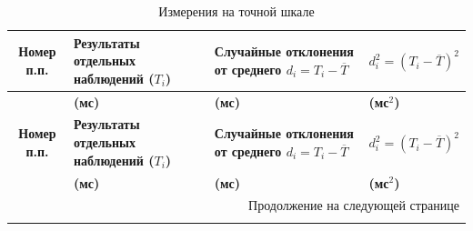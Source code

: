 \vspace{0.5cm}
\begin{longtable}{|c|p{3.2cm}|p{3.5cm}|p{3.5cm}|}
\caption{Измерения на точной шкале}
\label{tabl:2}\\
\hline
\textbf{Номер п.п.} & \textbf{Результаты отдельных наблюдений ($T_i$)} & \textbf{Случайные отклонения от среднего $d_i = T_i - \overline{T}$} & \textbf{$d_i^2 = (T_i - \overline{T})^2$} \\
\hline
 & \textbf{(мс)} & \textbf{(мс)} & \textbf{(мс\(^2\))} \\
\hline
\endfirsthead

\hline
\textbf{Номер п.п.} & \textbf{Результаты отдельных наблюдений ($T_i$)} & \textbf{Случайные отклонения от среднего $d_i = T_i - \overline{T}$} & \textbf{$d_i^2 = (T_i - \overline{T})^2$} \\
\hline
 & \textbf{(мс)} & \textbf{(мс)} & \textbf{(мс\(^2\))} \\
\hline
\endhead

\hline
\multicolumn{4}{|r|}{Продолжение на следующей странице} \\
\endfoot

\hline
\endlastfoot


\end{longtable}
